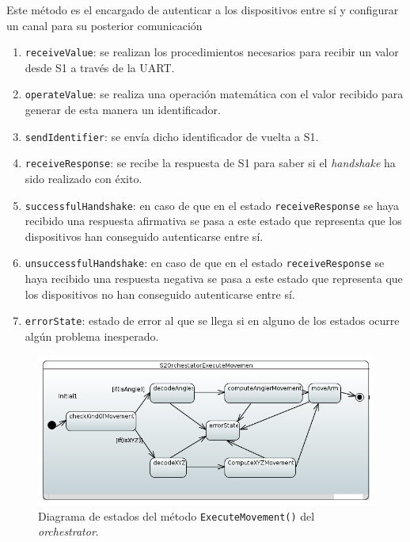 Este método es el encargado de autenticar a los dispositivos entre sí y configurar un canal para su posterior comunicación

\begin{enumerate}
    \item \texttt{receiveValue}: se realizan los procedimientos necesarios para recibir un valor desde \ac{S1} a través de la \ac{UART}.
    \item \texttt{operateValue}: se realiza una operación matemática con el valor recibido para generar de esta manera un identificador.
    \item \texttt{sendIdentifier}: se envía dicho identificador de vuelta a \ac{S1}.
    \item \texttt{receiveResponse}: se recibe la respuesta de \ac{S1} para saber si el \textit{handshake} ha sido realizado con éxito.
    \item \texttt{successfulHandshake}: en caso de que en el estado
    \texttt{receiveResponse} se haya recibido una respuesta afirmativa se pasa a este estado que representa que los dispositivos han conseguido autenticarse entre sí.
    \item \texttt{unsuccessfulHandshake}: en caso de que en el estado \texttt{receiveResponse} se haya recibido una respuesta negativa se pasa a este estado que representa que los dispositivos no han conseguido autenticarse
    entre sí.
    \item \texttt{errorState}: estado de error al que se llega si en alguno de los estados ocurre algún problema inesperado. 
\end{enumerate}

\begin{figure}[H]
    \centering
    \includegraphics[width=1\linewidth]{pictures/S2OrchestratorExecuteMovement.PNG}
    \caption{Diagrama de estados del método \texttt{ExecuteMovement()} del \textit{orchestrator}.}
    \label{fig:fun_execute_movement_orchestrator}
\end{figure}

